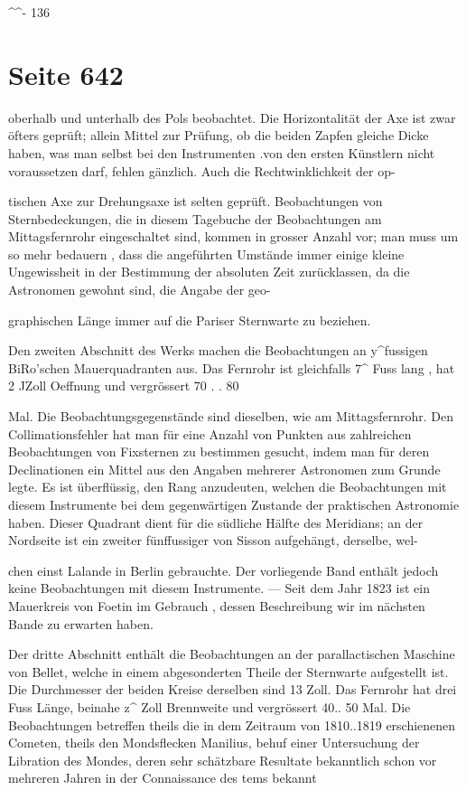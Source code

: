 \documentclass[10pt,a4paper]{article}
\begin{document}
\textasciicircum{}\textasciicircum{}- 136


\newpage
\section*{Seite 642}
oberhalb und unterhalb des Pols beobachtet. Die Horizontalität der Axe ist zwar öfters geprüft; allein Mittel zur Prüfung, ob die beiden Zapfen gleiche Dicke haben, was man selbst bei den Instrumenten .von den ersten Künstlern nicht voraussetzen darf, fehlen gänzlich. Auch die Rechtwinklichkeit der op-

tischen Axe zur Drehungsaxe ist selten geprüft. Beobachtungen von Sternbedeckungen, die in diesem Tagebuche der Beobachtungen am Mittagsfernrohr eingeschaltet sind, kommen in grosser Anzahl vor; man muss um so mehr bedauern , dass die angeführten Umstände immer einige kleine Ungewissheit in der Bestimmung der absoluten Zeit zurücklassen, da die Astronomen gewohnt sind, die Angabe der geo-

graphischen Länge immer auf die Pariser Sternwarte zu beziehen.

Den zweiten Abschnitt des Werks machen die Beobachtungen an y\textasciicircum{}fussigen BiRo'schen Mauerquadranten aus. Das Fernrohr ist gleichfalls 7\textasciicircum{} Fuss lang , hat 2 JZoll Oeffnung und vergrössert 70 . . 80

Mal. Die Beobachtungsgegenstände sind dieselben, wie am Mittagsfernrohr. Den Collimationsfehler hat man für eine Anzahl von Punkten aus zahlreichen Beobachtungen von Fixsternen zu bestimmen gesucht, indem man für deren Declinationen ein Mittel aus den Angaben mehrerer Astronomen zum Grunde legte. Es ist überflüssig, den Rang anzudeuten, welchen die Beobachtungen mit diesem Instrumente bei dem gegenwärtigen Zustande der praktischen Astronomie haben. Dieser Quadrant dient für die südliche Hälfte des Meridians; an der Nordseite ist ein zweiter fünffussiger von Sisson aufgehängt, derselbe, wel-

chen einst Lalande in Berlin gebrauchte. Der vorliegende Band enthält jedoch keine Beobachtungen mit diesem Instrumente. — Seit dem Jahr 1823 ist ein Mauerkreis von Foetin im Gebrauch , dessen Beschreibung wir im nächsten Bande zu erwarten haben.

Der dritte Abschnitt enthält die Beobachtungen an der parallactischen Maschine von Bellet, welche in einem abgesonderten Theile der Sternwarte aufgestellt ist. Die Durchmesser der beiden Kreise derselben sind 13 Zoll. Das Fernrohr hat drei Fuss Länge, beinahe z\textasciicircum{} Zoll Brennweite und vergrössert 40.. 50 Mal. Die Beobachtungen betreffen theils die in dem Zeitraum von 1810..1819 erschienenen Cometen, theils den Mondsflecken Manilius, behuf einer Untersuchung der Libration des Mondes, deren sehr schätzbare Resultate bekanntlich schon vor mehreren Jahren in der Connaissance des tems bekannt
\end{document}
